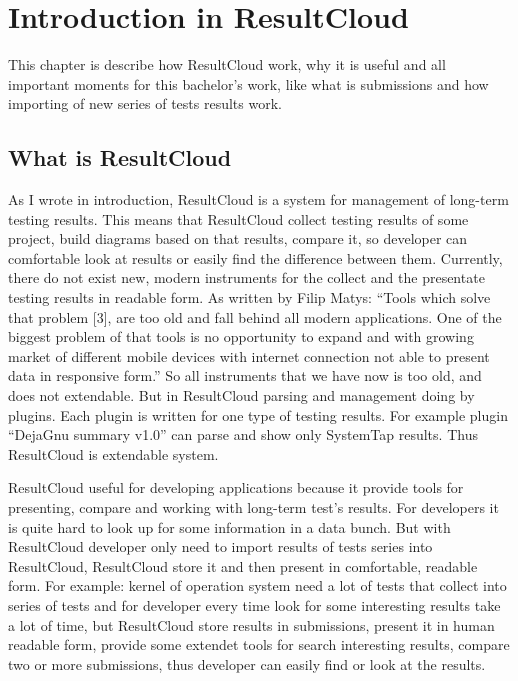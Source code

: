\chapter{Introduction in ResultCloud}
\label{ch:resultcloud}

This chapter is describe how ResultCloud work, why it is useful and all important moments for this bachelor's work, like what is submissions and how importing of new series of tests results work.

\section{What is ResultCloud}

As I wrote in introduction, ResultCloud is a system for management of long-term testing results. This means that ResultCloud collect testing results of some project, build diagrams based on that results, compare it, so developer can comfortable look at results or easily find the difference between them. Currently, there do not exist new, modern instruments for the collect and the presentate testing results in readable form. As written by Filip Matys: “Tools which solve that problem [3], are too old and fall behind all modern applications. One of the biggest problem of that tools is no opportunity to expand and with growing market of different mobile devices with internet connection not able to present data in responsive form.” \cite{filip} So all instruments that we have now is too old, and does not extendable. But in ResultCloud parsing and management doing by plugins. Each plugin is written for one type of testing results. For example plugin “DejaGnu summary v1.0” can parse and show only SystemTap results. Thus ResultCloud is extendable system.

ResultCloud useful for developing applications because it provide tools for presenting, compare and working with long-term test's results. For developers it is quite hard to look up for some information in a data bunch. But with ResultCloud developer only need to import results of tests series into ResultCloud, ResultCloud store it and then present in comfortable, readable form. For example: kernel of operation system need a lot of tests that collect into series of tests and for developer every time look for some interesting results take a lot of time, but ResultCloud store results in submissions, present it in human readable form, provide some extendet tools for search interesting results, compare two or more submissions, thus developer can easily find or look at the results.


